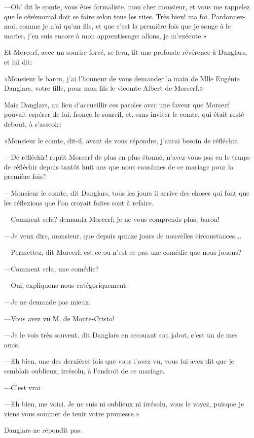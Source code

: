 —Oh! dit le comte, vous êtes formaliste, mon cher monsieur, et vous me rappelez que le cérémonial doit se faire selon tous les rites. Très bien! ma foi. Pardonnez-moi, comme je n'ai qu'un fils, et que c'est la première fois que je songe à le marier, j'en suis encore à mon apprentissage: allons, je m'exécute.» 

Et Morcerf, avec un sourire forcé, se leva, fit une profonde révérence à Danglars, et lui dit: 

«Monsieur le baron, j'ai l'honneur de vous demander la main de Mlle Eugénie Danglars, votre fille, pour mon fils le vicomte Albert de Morcerf.» 

Mais Danglars, au lieu d'accueillir ces paroles avec une faveur que Morcerf pouvait espérer de lui, fronça le sourcil, et, sans inviter le comte, qui était resté debout, à s'asseoir: 

«Monsieur le comte, dit-il, avant de vous répondre, j'aurai besoin de réfléchir. 

—De réfléchir! reprit Morcerf de plus en plus étonné, n'avez-vous pas eu le temps de réfléchir depuis tantôt huit ans que nous causâmes de ce mariage pour la première fois? 

—Monsieur le comte, dit Danglars, tous les jours il arrive des choses qui font que les réflexions que l'on croyait faites sont à refaire. 

—Comment cela? demanda Morcerf; je ne vous comprends plus, baron! 

—Je veux dire, monsieur, que depuis quinze jours de nouvelles circonstances\dots. 

—Permettez, dit Morcerf; est-ce ou n'est-ce pas une comédie que nous jouons? 

—Comment cela, une comédie? 

—Oui, expliquons-nous catégoriquement. 

—Je ne demande pas mieux. 

—Vous avez vu M. de Monte-Cristo! 

—Je le vois très souvent, dit Danglars en secouant son jabot, c'est un de mes amis. 

—Eh bien, une des dernières fois que vous l'avez vu, vous lui avez dit que je semblais oublieux, irrésolu, à l'endroit de ce mariage. 

—C'est vrai. 

—Eh bien, me voici. Je ne suis ni oublieux ni irrésolu, vous le voyez, puisque je viens vous sommer de tenir votre promesse.»  

Danglars ne répondit pas. 

